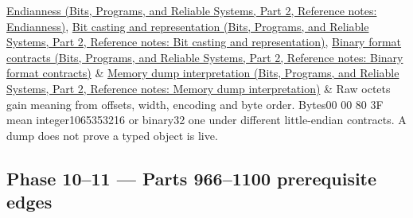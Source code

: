 {\begin{longtable}[]
\href{../01-Bits-Programs-and-Reliable-Systems-P02/main.pdf\#appendix-bc07c3d25b18}{Endianness (Bits, Programs, and Reliable Systems, Part 2, Reference notes: Endianness)}, \href{../01-Bits-Programs-and-Reliable-Systems-P02/main.pdf\#appendix-34ee45f161c1}{Bit casting and representation (Bits, Programs, and Reliable Systems, Part 2, Reference notes: Bit casting and representation)}, \href{../01-Bits-Programs-and-Reliable-Systems-P02/main.pdf\#appendix-590bbb2424c1}{Binary format contracts (Bits, Programs, and Reliable Systems, Part 2, Reference notes: Binary format contracts)} & \href{../01-Bits-Programs-and-Reliable-Systems-P02/main.pdf\#appendix-230b59c0676b}{Memory dump interpretation (Bits, Programs, and Reliable Systems, Part 2, Reference notes: Memory dump interpretation)} & Raw octets gain meaning from offsets, width, encoding and byte order. Bytes00 00 80 3F mean integer1065353216 or binary32 one under different little-endian contracts. A dump does not prove a typed object is live. \\
\end{longtable}
}

\subsection{Phase 10--11 --- Parts 966--1100 prerequisite edges}\label{appendix-4ad47bdd269a-phase-1011-parts-9661100-prerequisite-edges}

\hypertarget{appendix-4ad47bdd269a-phase-1011-parts-9661100-prerequisite-edges}{}

